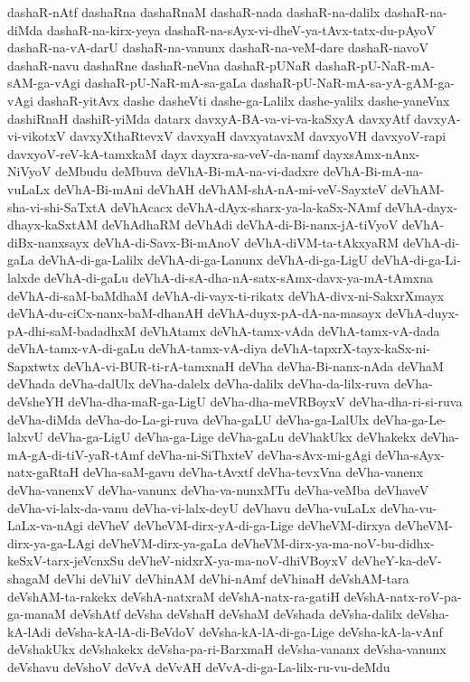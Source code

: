 {dashaR-nAtf
dashaRna
dashaRnaM
dashaR-nada
dashaR-na-dalilx
dashaR-na-diMda
dashaR-na-kirx-yeya
dashaR-na-sAyx-vi-dheV-ya-tAvx-tatx-du-pAyoV
dashaR-na-vA-darU
dashaR-na-vanunx
dashaR-na-veM-dare
dashaR-navoV
dashaR-navu
dashaRne
dashaR-neVna
dashaR-pUNaR
dashaR-pU-NaR-mA-sAM-ga-vAgi
dashaR-pU-NaR-mA-sa-gaLa
dashaR-pU-NaR-mA-sa-yA-gAM-ga-vAgi
dashaR-yitAvx
dashe
dasheVti
dashe-ga-Lalilx
dashe-yalilx
dashe-yaneVnx
dashiRnaH
dashiR-yiMda
datarx
davxyA-BA-va-vi-va-kaSxyA
davxyAtf
davxyA-vi-vikotxV
davxyXthaRtevxV
davxyaH
davxyatavxM
davxyoVH
davxyoV-rapi
davxyoV-reV-kA-tamxkaM
dayx
dayxra-sa-veV-da-namf
dayxsAmx-nAnx-NiVyoV
deMbudu
deMbuva
deVhA-Bi-mA-na-vi-dadxre
deVhA-Bi-mA-na-vuLaLx
deVhA-Bi-mAni
deVhAH
deVhAM-shA-nA-mi-veV-SayxteV
deVhAM-sha-vi-shi-SaTxtA
deVhAcacx
deVhA-dAyx-sharx-ya-la-kaSx-NAmf
deVhA-dayx-dhayx-kaSxtAM
deVhAdhaRM
deVhAdi
deVhA-di-Bi-nanx-jA-tiVyoV
deVhA-diBx-nanxsayx
deVhA-di-Savx-Bi-mAnoV
deVhA-diVM-ta-tAkxyaRM
deVhA-di-gaLa
deVhA-di-ga-Lalilx
deVhA-di-ga-Lanunx
deVhA-di-ga-LigU
deVhA-di-ga-Li-lalxde
deVhA-di-gaLu
deVhA-di-sA-dha-nA-satx-sAmx-davx-ya-mA-tAmxna
deVhA-di-saM-baMdhaM
deVhA-di-vayx-ti-rikatx
deVhA-divx-ni-SakxrXmayx
deVhA-du-ciCx-nanx-baM-dhanAH
deVhA-duyx-pA-dA-na-masayx
deVhA-duyx-pA-dhi-saM-badadhxM
deVhAtamx
deVhA-tamx-vAda
deVhA-tamx-vA-dada
deVhA-tamx-vA-di-gaLu
deVhA-tamx-vA-diya
deVhA-tapxrX-tayx-kaSx-ni-Sapxtwtx
deVhA-vi-BUR-ti-rA-tamxnaH
deVha
deVha-Bi-nanx-nAda
deVhaM
deVhada
deVha-dalUlx
deVha-dalelx
deVha-dalilx
deVha-da-lilx-ruva
deVha-deVsheYH
deVha-dha-maR-ga-LigU
deVha-dha-meVRBoyxV
deVha-dha-ri-si-ruva
deVha-diMda
deVha-do-La-gi-ruva
deVha-gaLU
deVha-ga-LalUlx
deVha-ga-Le-lalxvU
deVha-ga-LigU
deVha-ga-Lige
deVha-gaLu
deVhakUkx
deVhakekx
deVha-mA-gA-di-tiV-yaR-tAmf
deVha-ni-SiThxteV
deVha-sAvx-mi-gAgi
deVha-sAyx-natx-gaRtaH
deVha-saM-gavu
deVha-tAvxtf
deVha-tevxVna
deVha-vanenx
deVha-vanenxV
deVha-vanunx
deVha-va-nunxMTu
deVha-veMba
deVhaveV
deVha-vi-lalx-da-vanu
deVha-vi-lalx-deyU
deVhavu
deVha-vuLaLx
deVha-vu-LaLx-va-nAgi
deVheV
deVheVM-dirx-yA-di-ga-Lige
deVheVM-dirxya
deVheVM-dirx-ya-ga-LAgi
deVheVM-dirx-ya-gaLa
deVheVM-dirx-ya-ma-noV-bu-didhx-keSxV-tarx-jeVcnxSu
deVheV-nidxrX-ya-ma-noV-dhiVBoyxV
deVheY-ka-deV-shagaM
deVhi
deVhiV
deVhinAM
deVhi-nAmf
deVhinaH
deVshAM-tara
deVshAM-ta-rakekx
deVshA-natxraM
deVshA-natx-ra-gatiH
deVshA-natx-roV-pa-ga-manaM
deVshAtf
deVsha
deVshaH
deVshaM
deVshada
deVsha-dalilx
deVsha-kA-lAdi
deVsha-kA-lA-di-BeVdoV
deVsha-kA-lA-di-ga-Lige
deVsha-kA-la-vAnf
deVshakUkx
deVshakekx
deVsha-pa-ri-BarxmaH
deVsha-vananx
deVsha-vanunx
deVshavu
deVshoV
deVvA
deVvAH
deVvA-di-ga-La-lilx-ru-vu-deMdu
}
